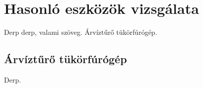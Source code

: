 \chapter{Hasonló eszközök vizsgálata}
Derp derp, valami szöveg. Árvíztűrő tükörfúrógép.


\section{Árvíztűrő tükörfúrógép}
Derp.



